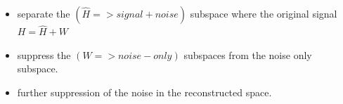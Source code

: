 \documentclass[a4paper]{article}
\numberwithin{equation}{subsection}
\numberwithin{figure}{subsection}
\begin{document}
\begin{itemize}
    \item separate the $(\hat{H}=>signal+noise)$  subspace where the original signal $H=\hat{H}+W$
    \item suppress the $(W=>noise-only)$ subspaces from the noise only subspace. 
    \item further suppression of the noise in the reconstructed space. 
\end{itemize}









\clearpage




\clearpage
\appendix





%
\end{document}
